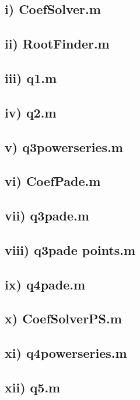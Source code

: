 \documentclass[10pt]{article}
\begin{document}
\subsection*{i) CoefSolver.m}

\subsection*{ii) RootFinder.m}

\subsection*{iii) q1.m}

\subsection*{iv) q2.m}

\subsection*{v) q3\textunderscore power\textunderscore series.m}

\subsection*{vi) CoefPade.m}

\subsection*{vii) q3\textunderscore pade.m}

\newpage
\subsection*{viii) q3\textunderscore pade \textunderscore points.m}

\subsection*{ix) q4\textunderscore pade.m}

\newpage
\subsection*{x) CoefSolverPS.m}

\newpage
\subsection*{xi) q4\textunderscore power\textunderscore series.m}

\subsection*{xii) q5.m}

\end{document}
